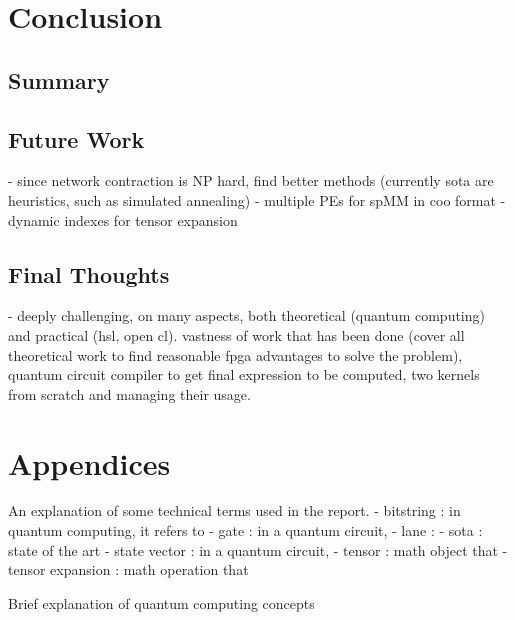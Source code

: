 \documentclass[12pt,oneside,a4paper]{article}
\begin{document}

\section{Conclusion}

\subsection{Summary}

\subsection{Future Work}
- since network contraction is NP hard, find better methods (currently sota are heuristics, such as simulated annealing)
- multiple PEs for spMM in coo format
- dynamic indexes for tensor expansion

\subsection{Final Thoughts}
- deeply challenging, on many aspects, both theoretical (quantum computing) and practical (hsl, open cl). vastness of work that has been done (cover all theoretical work to find reasonable fpga advantages to solve the problem), quantum circuit compiler to get final expression to be computed, two kernels from scratch and managing their usage.





\printbibliography[title={\section{References}}]




\section{Appendices}
An explanation of some technical terms used in the report.
- bitstring : in quantum computing, it refers to
- gate : in a quantum circuit,
- lane :
- sota : state of the art
- state vector : in a quantum circuit,
- tensor : math object that
- tensor expansion : math operation that

Brief explanation of quantum computing concepts


\end{document}
